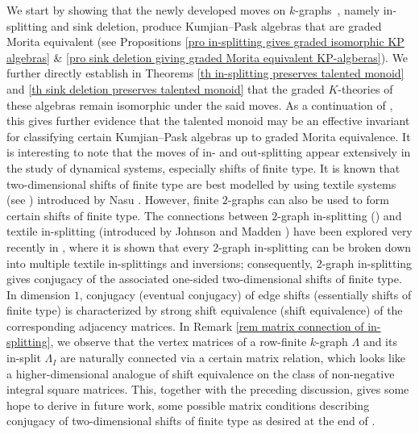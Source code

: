\documentclass[12pt]{amsart}
\theoremstyle{definition}
\theoremstyle{remark}
\begin{document}
We start by showing that the newly developed moves on $k$-graphs~\cite{EFGGGP}, namely in-splitting and sink deletion, produce Kumjian--Pask algebras that are graded Morita equivalent (see Propositions \ref{pro in-splitting gives graded isomorphic KP algebras} \& \ref{pro sink deletion giving graded Morita equivalent KP-algberas}). We further directly establish in Theorems \ref{th in-splitting preserves talented monoid} and \ref{th sink deletion preserves talented monoid} that the graded $K$-theories of these algebras remain isomorphic under the said moves. As a continuation of \cite{HMPS}, this gives further evidence that the talented monoid may be an effective invariant for classifying certain Kumjian--Pask algebras up to graded Morita equivalence. It is interesting to note that the moves of in- and out-splitting appear extensively in the study of dynamical systems, especially shifts of finite type. It is known that two-dimensional shifts of finite type are best modelled by using textile systems (see \cite{JM}) introduced by Nasu \cite{Nasu}. However, finite $2$-graphs can also be used to form certain shifts of finite type. The connections between $2$-graph in-splitting (\cite{EFGGGP}) and textile in-splitting (introduced by Johnson and Madden \cite{JM}) have been explored very recently in \cite{WoA}, where it is shown that every $2$-graph in-splitting can be broken down into multiple textile in-splittings and inversions; consequently, $2$-graph in-splitting gives conjugacy of the associated one-sided two-dimensional shifts of finite type. In dimension $1$, conjugacy (eventual conjugacy) of edge shifts (essentially shifts of finite type) is characterized by strong shift equivalence (shift equivalence) of the corresponding adjacency matrices. In Remark \ref{rem matrix connection of in-splitting}, we observe that the vertex matrices of a row-finite $k$-graph $\Lambda$ and its in-split $\Lambda_I$ are naturally connected via a certain matrix relation, which looks like a higher-dimensional analogue of shift equivalence on the class of non-negative integral square matrices. This, together with the preceding discussion, gives some hope to derive in future work, some possible matrix conditions describing conjugacy of two-dimensional shifts of finite type as desired at the end of \cite{JM}. 
\end{document}

